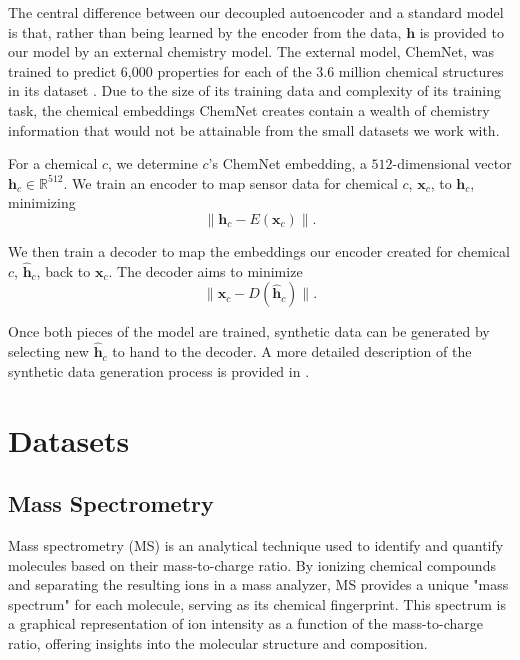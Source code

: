 \documentclass[sigconf]{acmart}
\begin{document}
The central difference between our decoupled autoencoder and a standard model is that, rather than being learned by the encoder from the data, $\mathbf{h}$ is provided to our model by an external chemistry model. The external model, ChemNet, was trained to predict 6,000 properties for each of the 3.6 million chemical structures in its dataset \cite{preuer2019frechet}. Due to the size of its training data and complexity of its training task, the chemical embeddings ChemNet creates contain a wealth of chemistry information that would not be attainable from the small datasets we work with. 

For a chemical $c$, we determine $c$'s ChemNet embedding, a $512$-dimensional vector $\mathbf{h}_c \in \mathbb{R}^{512}$. We train an encoder to map sensor data for chemical $c$, $\mathbf{x}_c$, to $\mathbf{h}_c$, minimizing
\begin{equation}
\|\mathbf{h}_c - E(\mathbf{x}_c)\|. 
\label{enc loss function}
\end{equation}

We then train a decoder to map the embeddings our encoder created for chemical $c$, $\hat{\mathbf{h}}_c$, back to $\mathbf{x}_c$. The decoder aims to minimize 
\begin{equation}
\|\mathbf{x}_c - D(\hat{\mathbf{h}}_c)\|.
\label{dec loss function}
\end{equation}

Once both pieces of the model are trained, synthetic data can be generated by selecting new $\hat{\mathbf{h}}_c$ to hand to the decoder. A more detailed description of the synthetic data generation process is provided in \cite{dunham2024oracle}.

\section{Datasets}

\subsection{Mass Spectrometry}

Mass spectrometry (MS) is an analytical technique used to identify and quantify molecules based on their mass-to-charge ratio. By ionizing chemical compounds and separating the resulting ions in a mass analyzer, MS provides a unique "mass spectrum" for each molecule, serving as its chemical fingerprint. This spectrum is a graphical representation of ion intensity as a function of the mass-to-charge ratio, offering insights into the molecular structure and composition.\cite{Vadakedath2022MS}
\end{document}
